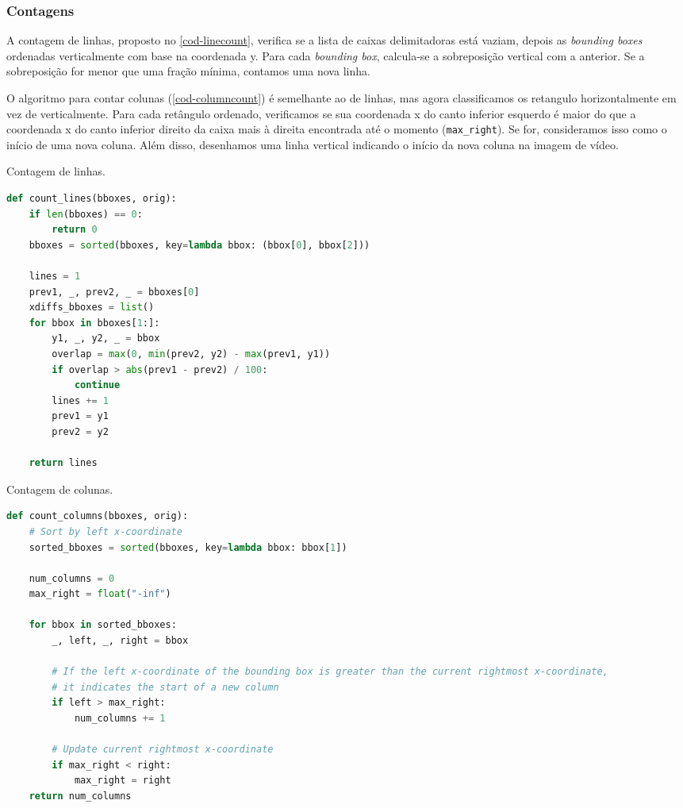 \documentclass[english, 
               brazil, 
               bsc] %
               {dcomp-abntex2}
\begin{document}
\subsubsection{Contagens}

A contagem de linhas, proposto no \autoref{cod-linecount}, verifica se a lista de caixas delimitadoras está vaziam, depois as \textit{bounding boxes} ordenadas verticalmente com base na coordenada y. Para cada \textit{bounding box}, calcula-se a sobreposição vertical com a anterior. Se a sobreposição for menor que uma fração mínima, contamos uma nova linha.

O algoritmo para contar colunas (\autoref{cod-columncount}) é semelhante ao de linhas, mas agora classificamos os retangulo horizontalmente em vez de verticalmente. Para cada retângulo ordenado, verificamos se sua coordenada x do canto inferior esquerdo é maior do que a coordenada x do canto inferior direito da caixa mais à direita encontrada até o momento (\texttt{max\_right}). Se for, consideramos isso como o início de uma nova coluna. Além disso, desenhamos uma linha vertical indicando o início da nova coluna na imagem de vídeo.

\begin{codigo}[h]
  \caption{\small Contagem de linhas.}
 \label{cod-linecount}
\begin{lstlisting}[language=python]
def count_lines(bboxes, orig):
    if len(bboxes) == 0:
        return 0
    bboxes = sorted(bboxes, key=lambda bbox: (bbox[0], bbox[2]))

    lines = 1
    prev1, _, prev2, _ = bboxes[0]
    xdiffs_bboxes = list()
    for bbox in bboxes[1:]:
        y1, _, y2, _ = bbox
        overlap = max(0, min(prev2, y2) - max(prev1, y1))
        if overlap > abs(prev1 - prev2) / 100:
            continue
        lines += 1
        prev1 = y1
        prev2 = y2

    return lines
\end{lstlisting}
\end{codigo}


\begin{codigo}[h]
  \caption{\small Contagem de colunas.}
 \label{cod-columncount}
\begin{lstlisting}[language=python]
def count_columns(bboxes, orig):
    # Sort by left x-coordinate
    sorted_bboxes = sorted(bboxes, key=lambda bbox: bbox[1])

    num_columns = 0
    max_right = float("-inf")

    for bbox in sorted_bboxes:
        _, left, _, right = bbox

        # If the left x-coordinate of the bounding box is greater than the current rightmost x-coordinate,
        # it indicates the start of a new column
        if left > max_right:
            num_columns += 1

        # Update current rightmost x-coordinate
        if max_right < right:
            max_right = right
    return num_columns
\end{lstlisting}
\end{codigo}
\end{document}
